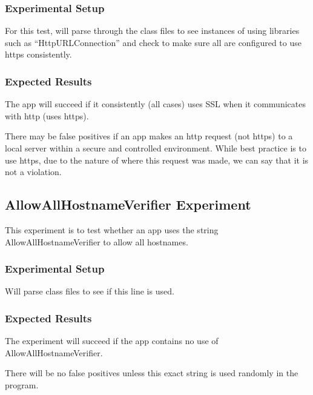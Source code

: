 \documentclass[10pt,twocolumn,pdftex]{article}
\begin{document}
    \subsubsection{Experimental Setup}
    For this test, will parse through the class files to see instances of using libraries such as “HttpURLConnection” and check to make sure all are configured to use https consistently.

    \subsubsection{Expected Results}
    The app will succeed if it consistently (all cases) uses SSL when it communicates with http (uses https).

    There may be false positives if an app makes an http request (not https) to a local server within a secure and controlled environment. While best practice is to use https, due to the nature of where this request was made, we can say that it is not a violation.


\subsection{AllowAllHostnameVerifier Experiment}
This experiment is to test whether an app uses the string AllowAllHostnameVerifier to allow all hostnames.

    \subsubsection{Experimental Setup}
    Will parse class files to see if this line is used.

    \subsubsection{Expected Results}
    The experiment will succeed if the app contains no use of AllowAllHostnameVerifier. 

    There will be no false positives unless this exact string is used randomly in the program.



\end{document}
